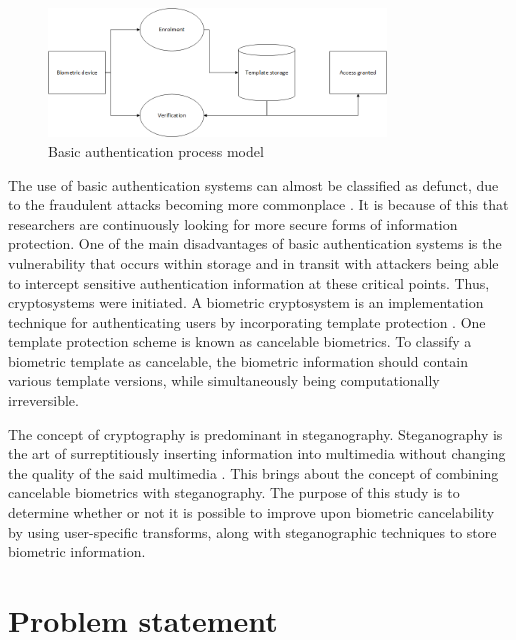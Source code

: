 \begin{figure}[hbtp]
\centering
\includegraphics[width=0.8\textwidth]{Chapter1/Figs/Figure1-1.png}
% 
\caption{ Basic authentication process model}
\label{fig:basic_authentication_process_model}
\end{figure}

The use of basic authentication systems can almost be classified as defunct, due to the fraudulent attacks becoming more commonplace \cite{Kashyap2016}. It is because of this that researchers are continuously looking for more secure forms of information protection. One of the main disadvantages of basic authentication systems is the vulnerability that occurs within storage and in transit with attackers being able to intercept sensitive authentication information at these critical points. Thus, cryptosystems were initiated. A biometric cryptosystem is an implementation technique for authenticating users by incorporating template protection \citep{Uludag2004}. One template protection scheme is known as cancelable biometrics. To classify a biometric template as cancelable, the biometric information should contain various template versions, while simultaneously being computationally irreversible. 

The concept of cryptography is predominant in steganography. Steganography is the art of surreptitiously inserting information into multimedia without changing the quality of the said multimedia \citep{Kishor2016}. This brings about the concept of combining cancelable biometrics with steganography.
The purpose of this study is to determine whether or not it is possible to improve upon biometric cancelability by using user-specific transforms, along with steganographic techniques to store biometric information.




\section{Problem statement} %



